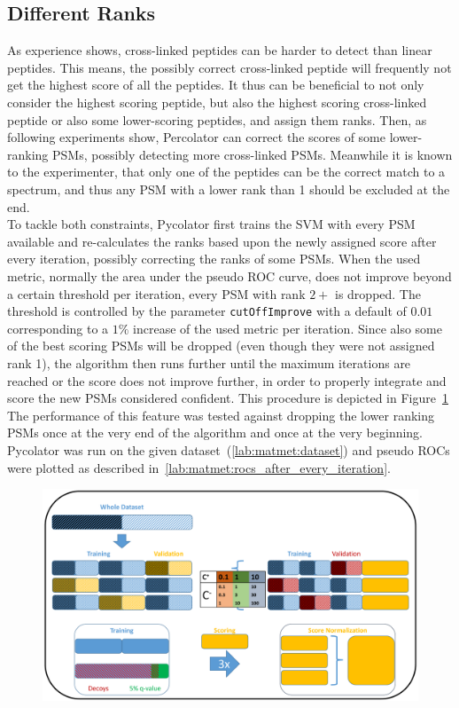 \subsection{Different Ranks}
\label{lab:matmet:ranks}
As experience shows, cross-linked peptides can be harder to detect than linear peptides. This means, the possibly correct cross-linked peptide will frequently not get the highest score of all the peptides. It thus can be beneficial to not only consider the highest scoring peptide, but also the highest scoring cross-linked peptide or also some lower-scoring peptides, and assign them ranks. Then, as following experiments show, Percolator can correct the scores of some lower-ranking PSMs, possibly detecting more cross-linked PSMs. Meanwhile it is known to the experimenter, that only one of the peptides can be the correct match to a spectrum, and thus any PSM with a lower rank than 1 should be excluded at the end.\\
To tackle both constraints, Pycolator first trains the SVM with every PSM available and re-calculates the ranks based upon the newly assigned score after every iteration, possibly correcting the ranks of some PSMs. When the used metric, normally the area under the pseudo ROC curve, does not improve beyond a certain threshold per iteration, every PSM with rank $2+$ is dropped. The threshold is controlled by the parameter \texttt{cutOffImprove} with a default of $0.01$ corresponding to a $1\%$ increase of the used metric per iteration. Since also some of the best scoring PSMs will be dropped (even though they were not assigned rank 1), the algorithm then runs further until the maximum iterations are reached or the score does not improve further, in order to properly integrate and score the new PSMs considered confident. This procedure is depicted in Figure~\ref{fig:optimalRanking_outline}\\
The performance of this feature was tested against dropping the lower ranking PSMs once at the very end of the algorithm and once at the very beginning. Pycolator was run on the given dataset~(\ref{lab:matmet:dataset}) and pseudo ROCs were plotted as described in~\ref{lab:matmet:rocs_after_every_iteration}.
\renewcommand{\baselinestretch}{0.9}
\begin{figure}
	\normalsize
	\centering
	\includegraphics[width = \textwidth, page=2]{figures/Pycolator_diagram.pdf}
	\caption[Procedure to deal with ranked PSMs]{}
	\label{fig:optimalRanking_outline}
\end{figure}
\renewcommand{\baselinestretch}{1}\\
